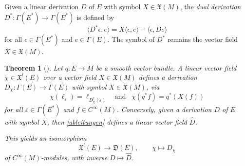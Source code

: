 \documentclass{amsart}
\theoremstyle{plain}
\newtheorem{theorem}{Theorem}[section]
\newcommand{\lie}[1]{\mathfrak{#1}}
\newcommand{\mx}{\mathfrak{X}}
\begin{document}
Given a linear derivation $D$ of $E$ with symbol $X\in\mx(M)$, the \emph{dual derivation} $D^*\colon\Gamma(E^*)\to\Gamma(E^*)$ is defined by 
\[ \langle D^*\epsilon, e\rangle=X\langle \epsilon, e\rangle -\langle \epsilon, De\rangle
\]
for all $\epsilon\in\Gamma(E^*)$ and $e\in\Gamma(E)$. The symbol of $D^*$ remains the vector field $X\in\mx(M)$. 

\bigskip

\begin{theorem}[\cite{Mackenzie05}]
Let $q\colon E\to M$ be a smooth vector bundle.
A
linear vector field $\chi\in\mx^l(E)$ over a vector field $X\in\mx(M)$ defines a derivation $D_\chi\colon \Gamma(E) \to \Gamma(E)$ with symbol $X\in
\mx(M)$, via 
\begin{equation}\label{ableitungen}
\chi(\ell_{\varepsilon}) 
= \ell_{D_\chi^*(\varepsilon)} \,\,\,\, \text{ and }  \,\,\, \chi(q^*f)= q^*(X(f))
\end{equation}
for all $\varepsilon\in\Gamma(E^*)$ and $f\in C^\infty(M)$.
Conversely, given a derivation $D$ of $E$ with symbol $X$, then \eqref{ableitungen}
defines a linear vector field $\widehat D$.

This yields an isomorphism 
\[ \mx^l(E)\to \lie D(E), \qquad \chi\mapsto D_\chi
\]
of $C^\infty(M)$-modules, with inverse $D\mapsto \widehat D$.
\end{theorem}
\end{document}
